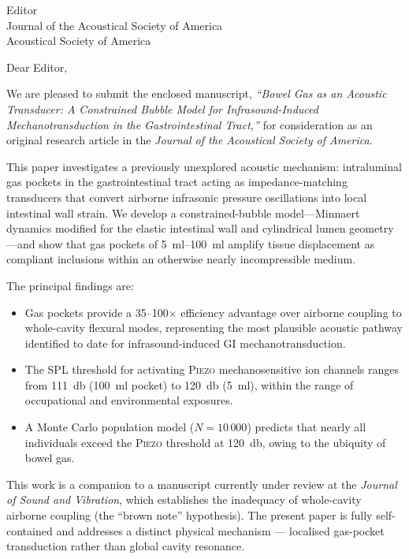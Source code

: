 \documentclass[12pt]{letter}
\date{\today}
\begin{document}
\begin{letter}{%
  Editor\\
  Journal of the Acoustical Society of America\\
  Acoustical Society of America%
}

\opening{Dear Editor,}

We are pleased to submit the enclosed manuscript, \emph{``Bowel Gas as an
Acoustic Transducer: A Constrained Bubble Model for Infrasound-Induced
Mechanotransduction in the Gastrointestinal Tract,''} for consideration as an
original research article in the \emph{Journal of the Acoustical Society of
America}.

This paper investigates a previously unexplored acoustic mechanism:
intraluminal gas pockets in the gastrointestinal tract acting as
impedance-matching transducers that convert airborne infrasonic pressure
oscillations into local intestinal wall strain.  We develop a
constrained-bubble model---Minnaert dynamics modified for the elastic
intestinal wall and cylindrical lumen geometry---and show that gas pockets of
\SIrange{5}{100}{\milli\litre} amplify tissue displacement as compliant
inclusions within an otherwise nearly incompressible medium.

The principal findings are:
\begin{itemize}
  \item Gas pockets provide a 35--100$\times$ efficiency advantage over
    airborne coupling to whole-cavity flexural modes, representing the most
    plausible acoustic pathway identified to date for infrasound-induced GI
    mechanotransduction.
  \item The SPL threshold for activating \textsc{Piezo} mechanosensitive ion
    channels ranges from \SI{111}{\decibel} (\SI{100}{\milli\litre} pocket)
    to \SI{120}{\decibel} (\SI{5}{\milli\litre}), within the range of
    occupational and environmental exposures.
  \item A Monte Carlo population model ($N = 10\,000$) predicts that nearly
    all individuals exceed the \textsc{Piezo} threshold at
    \SI{120}{\decibel}, owing to the ubiquity of bowel gas.
\end{itemize}

This work is a companion to a manuscript currently under review at the
\emph{Journal of Sound and Vibration}, which establishes the inadequacy of
whole-cavity airborne coupling (the ``brown note'' hypothesis).  The present
paper is fully self-contained and addresses a distinct physical mechanism
--- localised gas-pocket transduction rather than global cavity resonance.


\end{letter}
\end{document}
